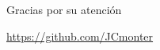\documentclass[compress,12pt]{beamer}
\begin{document}
\begin{frame}
      \centering
      \Huge{\smiley Gracias por su atención\smiley}
      \vfill
      \scalebox{4}{\faGithub} \par\bigskip
      \url{https://github.com/JCmonter} \\
\end{frame}
\end{document}
